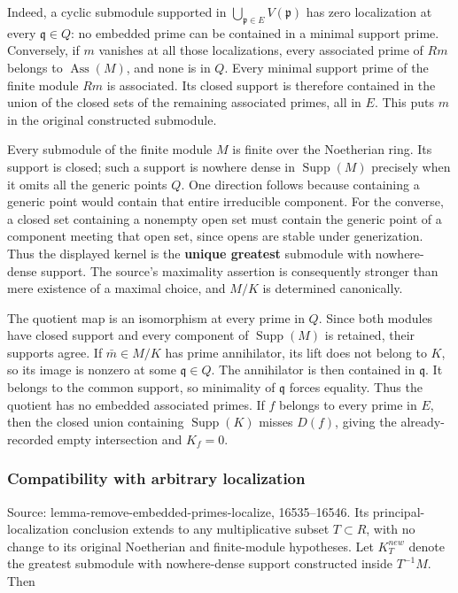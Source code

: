 Indeed, a cyclic submodule supported in \(\bigcup_{\mathfrak p\in E}V(\mathfrak p)\) has zero localization at every \(\mathfrak q\in Q\): no embedded prime can be contained in a minimal support prime. Conversely, if \(m\) vanishes at all those localizations, every associated prime of \(Rm\) belongs to \(\operatorname{Ass}(M)\), and none is in \(Q\). Every minimal support prime of the finite module \(Rm\) is associated. Its closed support is therefore contained in the union of the closed sets of the remaining associated primes, all in \(E\). This puts \(m\) in the original constructed submodule.

Every submodule of the finite module \(M\) is finite over the Noetherian ring. Its support is closed; such a support is nowhere dense in \(\operatorname{Supp}(M)\) precisely when it omits all the generic points \(Q\). One direction follows because containing a generic point would contain that entire irreducible component. For the converse, a closed set containing a nonempty open set must contain the generic point of a component meeting that open set, since opens are stable under generization. Thus the displayed kernel is the \textbf{unique greatest} submodule with nowhere-dense support. The source's maximality assertion is consequently stronger than mere existence of a maximal choice, and \(M/K\) is determined canonically.

The quotient map is an isomorphism at every prime in \(Q\). Since both modules have closed support and every component of \(\operatorname{Supp}(M)\) is retained, their supports agree. If \(\bar m\in M/K\) has prime annihilator, its lift does not belong to \(K\), so its image is nonzero at some \(\mathfrak q\in Q\). The annihilator is then contained in \(\mathfrak q\). It belongs to the common support, so minimality of \(\mathfrak q\) forces equality. Thus the quotient has no embedded associated primes. If \(f\) belongs to every prime in \(E\), then the closed union containing \(\operatorname{Supp}(K)\) misses \(D(f)\), giving the already-recorded empty intersection and \(K_f=0\).

\subsubsection{Compatibility with arbitrary localization}\label{algebra-proof-006-compatibility-with-arbitrary-localization}

Source: lemma-\AlgebraIdentifierBreak{}remove-\AlgebraIdentifierBreak{}embedded-\AlgebraIdentifierBreak{}primes-\AlgebraIdentifierBreak{}localize, 16535--16546. Its principal-localization conclusion extends to any multiplicative subset \(T\subset R\), with no change to its original Noetherian and finite-module hypotheses. Let \(K_T^{new}\) denote the greatest submodule with nowhere-dense support constructed inside \(T^{-1}M\). Then


